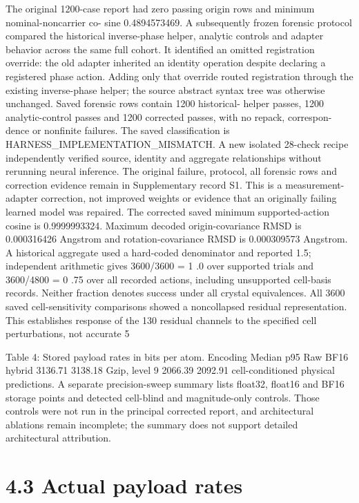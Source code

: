 \documentclass[11pt]{article}
\begin{document}
The original 1200-case report had zero passing origin rows and minimum nominal-noncarrier co-
sine 0.4894573469. A subsequently frozen forensic protocol compared the historical inverse-phase
helper, analytic controls and adapter behavior across the same full cohort. It identified an omitted
registration override: the old adapter inherited an identity operation despite declaring a registered
phase action.
Adding only that override routed registration through the existing inverse-phase helper; the
source abstract syntax tree was otherwise unchanged. Saved forensic rows contain 1200 historical-
helper passes, 1200 analytic-control passes and 1200 corrected passes, with no repack, correspon-
dence or nonfinite failures. The saved classification is HARNESS\_IMPLEMENTATION\_MISMATCH. A new
isolated 28-check recipe independently verified source, identity and aggregate relationships without
rerunning neural inference. The original failure, protocol, all forensic rows and correction evidence
remain in Supplementary record S1. This is a measurement-adapter correction, not improved
weights or evidence that an originally failing learned model was repaired.
The corrected saved minimum supported-action cosine is 0.9999993324. Maximum decoded
origin-covariance RMSD is 0.000316426 Angstrom and rotation-covariance RMSD is 0.000309573
Angstrom. A historical aggregate used a hard-coded denominator and reported 1.5; independent
arithmetic gives 3600/3600 = 1 .0 over supported trials and 3600/4800 = 0 .75 over all recorded
actions, including unsupported cell-basis records. Neither fraction denotes success under all crystal
equivalences.
All 3600 saved cell-sensitivity comparisons showed a noncollapsed residual representation. This
establishes response of the 130 residual channels to the specified cell perturbations, not accurate
5

Table 4: Stored payload rates in bits per atom.
Encoding Median p95
Raw BF16 hybrid 3136.71 3138.18
Gzip, level 9 2066.39 2092.91
cell-conditioned physical predictions. A separate precision-sweep summary lists float32, float16 and
BF16 storage points and detected cell-blind and magnitude-only controls. Those controls were not
run in the principal corrected report, and architectural ablations remain incomplete; the summary
does not support detailed architectural attribution.

\section*{4.3 Actual payload rates}
\end{document}
